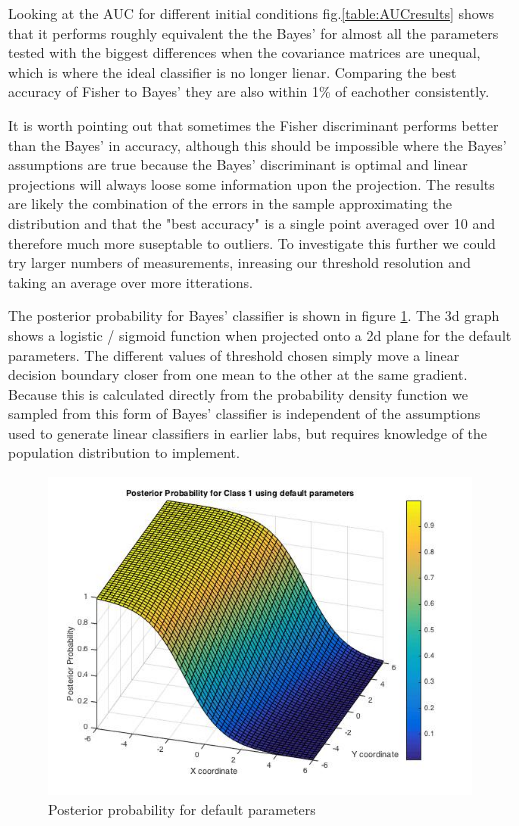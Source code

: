 \documentclass[a4paper,11pt, twocolumn]{article}
\begin{document}
Looking at the AUC for different initial conditions fig.\ref{table:AUCresults} shows that it performs roughly equivalent the the Bayes' for almost all the parameters tested with the biggest differences when the covariance matrices are unequal, which is where the ideal classifier is no longer lienar. Comparing the best accuracy of Fisher to Bayes' they are also within 1\% of eachother consistently. 

It is worth pointing out that sometimes the Fisher discriminant performs better than the Bayes' in accuracy, although this should be impossible where the Bayes' assumptions are true because the Bayes' discriminant is optimal and linear projections will always loose some information upon the projection. The results are likely the combination of the errors in the sample approximating the distribution and that the "best accuracy" is a single point averaged over 10 and therefore much more suseptable to outliers. To investigate this further we could try larger numbers of measurements, inreasing our threshold resolution and taking an average over more itterations. 

The posterior probability for Bayes' classifier is shown in figure \ref{figure:BayesDefault}. The 3d graph shows a logistic / sigmoid function when projected onto a 2d plane for the default parameters. The different values of threshold chosen simply move a linear decision boundary closer from one mean to the other at the same gradient. Because this is calculated directly from the probability density function we sampled from this form of Bayes' classifier is independent of the assumptions used to generate linear classifiers in earlier labs, but requires knowledge of the population distribution to implement. 

\begin{figure}[ht]
	\includegraphics[width=0.7\linewidth]{3dDefault.jpg}
	\centering
	\caption{Posterior probability for default parameters}
    \label{figure:BayesDefault}
\end{figure}
\end{document}
